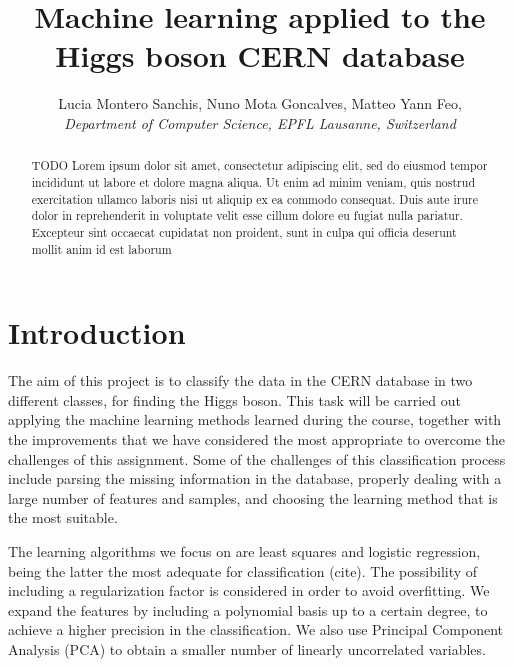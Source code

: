 \documentclass[10pt,conference,compsocconf]{IEEEtran}
\begin{document}
\title{Machine learning applied to the Higgs boson CERN database}

\author{
  Lucia Montero Sanchis, Nuno Mota Goncalves, Matteo Yann Feo,  \\
  \textit{Department of Computer Science, EPFL Lausanne, Switzerland}
}

\maketitle

\begin{abstract}
  TODO
  Lorem ipsum dolor sit amet, consectetur adipiscing elit, sed do eiusmod tempor incididunt ut labore et dolore magna aliqua. Ut enim ad minim veniam, quis nostrud exercitation ullamco laboris  nisi ut aliquip ex ea commodo consequat. Duis aute irure dolor in reprehenderit in voluptate velit esse cillum dolore eu fugiat nulla pariatur. Excepteur sint occaecat cupidatat non  proident, sunt in culpa qui officia deserunt mollit anim id est laborum
\end{abstract}

\section{Introduction}
The aim of this project is to classify the data in the CERN database in two different classes, for finding the Higgs boson. This task will be carried out applying the machine learning methods learned during the course, together with the improvements that we have considered the most appropriate to overcome the challenges of this assignment. Some of the challenges of this classification process include parsing the missing information in the database, properly dealing with a large number of features and samples, and choosing the learning method that is the most suitable.

The learning algorithms we focus on are least squares and logistic regression, being the latter the most adequate for classification (cite). The possibility of including a regularization factor is considered in order to avoid overfitting. We expand the features by including a polynomial basis up to a certain degree, to achieve a higher precision in the classification. We also use Principal Component Analysis (PCA) to obtain a smaller number of linearly uncorrelated variables.

\end{document}
